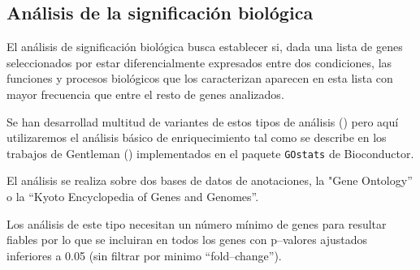 \documentclass[a4paper]{article}\usepackage[]{graphicx}\usepackage[]{color}
\begin{document}
\subsection{Análisis de la significación biológica}

El análisis de significación biológica busca establecer si, dada una lista de genes seleccionados por estar diferencialmente expresados entre dos condiciones, las funciones y procesos biológicos que los caracterizan aparecen en esta lista con mayor frecuencia que entre el resto de genes analizados.

Se han desarrollad multitud de variantes de estos tipos de análisis (\cite{Khatri:2005}) pero aquí utilizaremos el análisis básico de enriquecimiento tal como se describe en los trabajos de Gentleman (\cite{Gentleman:2004}) implementados en el paquete \texttt{GOstats} de Bioconductor.

El análisis se realiza sobre dos bases de datos de anotaciones, la "Gene Ontology'' o la ``Kyoto Encyclopedia of Genes and Genomes''.

Los análisis de este tipo necesitan un número mínimo de genes para resultar fiables por lo que se incluiran en todos los genes con p--valores ajustados inferiores a 0.05 (sin filtrar por minimo ``fold--change'').
\end{document}
